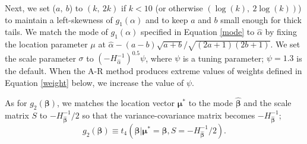 \documentclass[article]{jss}
\begin{document}
Next, we set ($a,~ b$) to $(k,~ 2k)$ if $k<10$ (or otherwise $(\log(k),~ 2\log(k))$)   to maintain a left-skewness of $g_1(\alpha)$ and to keep  $a$ and $b$ small enough for thick tails. We match the mode of $g_1(\alpha)$ specified in Equation \ref{mode} to $\hat{\alpha}$ by fixing the location parameter $\mu$ at $\hat{\alpha}-(a-b)\sqrt{a+b}/\sqrt{(2a+1)(2b+1)}$. We set  the scale parameter $\sigma$ to $(-H^{-1}_{\hat{\alpha}})^{0.5}\psi$, where $\psi$ is a tuning parameter; $\psi=1.3$ is the default. When the A-R method produces extreme values of weights defined in Equation \ref{weight} below, we increase the value of $\psi$.  %

As for $g_2(\boldsymbol{\beta})$, we matches the location vector $\boldsymbol{\mu}^\ast$ to the mode $\hat{\boldsymbol{\beta}}$ and the scale matrix $S$ to $-H^{-1}_{\hat{\boldsymbol{\beta}}}/2$ so that the variance-covariance matrix becomes $-H^{-1}_{\hat{\boldsymbol{\beta}}}$;
\begin{equation}
g_2(\boldsymbol{\beta})\equiv t_4(\boldsymbol{\beta}\vert \boldsymbol{\mu}^\ast=\hat{\boldsymbol{\beta}}, S=-H^{-1}_{\hat{\boldsymbol{\beta}}}/2).
\end{equation}
\end{document}
